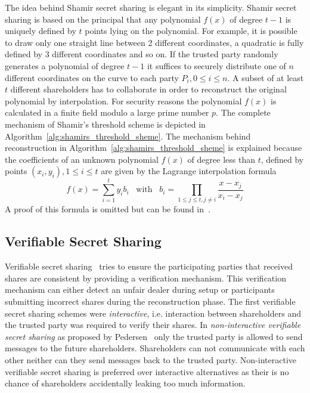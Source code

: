 The idea behind Shamir secret sharing is elegant in its simplicity. Shamir secret sharing is based on the principal that any polynomial $f \left( x \right)$ of degree $t-1$ is uniquely defined by $t$ points lying on the polynomial. For example, it is possible to draw only one straight line between 2 different coordinates, a quadratic is fully defined by 3 different coordinates and so on. If the trusted party randomly generates a polynomial of degree $t-1$ it suffices to securely distribute one of $n$ different coordinates on the curve to each party $P_i, 0 \leq i \leq n$. A subset of at least $t$ different shareholders has to collaborate in order to reconstruct the original polynomial by interpolation. For security reasons the polynomial $f \left( x \right)$ is calculated in a finite field modulo a large prime number $p$. The complete mechanism of Shamir's threshold scheme is depicted in Algorithm~\ref{alg:shamirs_threshold_sheme}. The mechanism behind reconstruction in Algorithm~\ref{alg:shamirs_threshold_sheme} is explained because the coefficients of an unknown polynomial $f \left( x \right)$ of degree less than $t$, defined by points $\left( x_i, y_i \right), 1 \leq i \leq t$ are given by the Lagrange interpolation formula
\begin{equation*}
 f \left( x \right) = \sum^t_{i=1}y_i b_i \; \; \; \textrm{with} \; \; \; b_i = \prod_{1 \leq j \leq t, j \neq i} \frac{x-x_j}{x_i-x_j}
\end{equation*}
A proof of this formula is omitted but can be found in~\cite{site:proofwiki_lagrange}.

\subsection{Verifiable Secret Sharing}
Verifiable secret sharing~\cite{art:ChorGMA85} tries to ensure the participating parties that received shares are consistent by providing a verification mechanism. This verification mechanism can either detect an unfair dealer during setup or participants submitting incorrect shares during the reconstruction phase. The first verifiable secret sharing schemes were \textit{interactive}, i.e. interaction between shareholders and the trusted party was required to verify their shares. In \textit{non-interactive verifiable secret sharing} as proposed by Pedersen~\cite{art:Pedersen91} only the trusted party is allowed to send messages to the future shareholders. Shareholders can not communicate with each other neither can they send messages back to the trusted party. Non-interactive verifiable secret sharing is preferred over interactive alternatives as their is no chance of shareholders accidentally leaking too much information.

